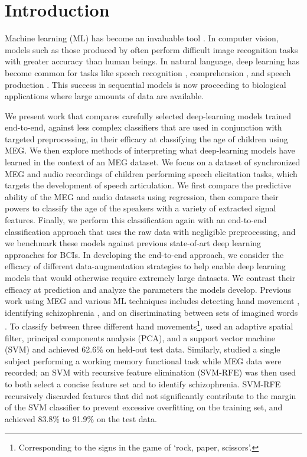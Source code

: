 \documentclass[utf8]{frontiersSCNS} %
\begin{document}
\section{Introduction}


Machine learning (ML) has become an invaluable tool \cite{LeCun2015}. In computer vision, models such as those produced by \cite{He2015a} often perform difficult image recognition tasks with greater accuracy than  human beings. In natural language, deep learning has become common for tasks like speech recognition \cite{Bahdanau}, comprehension \cite{Moritz}, and speech production \cite{VanDenOord}. This success in sequential models is now proceeding to biological applications where large amounts of data are available. %

We present work that compares carefully selected deep-learning models trained end-to-end, against less complex classifiers that are used in conjunction with targeted preprocessing, in their efficacy at classifying the age of children using MEG. We then explore methods of interpreting what  deep-learning models have learned in the context of an MEG dataset. We focus on a dataset of synchronized MEG and audio recordings of children performing speech elicitation tasks, which targets the development of speech articulation. We first compare the predictive ability of the MEG and audio datasets using regression, then compare their powers to classify the age of the speakers with a variety of extracted signal features. Finally, we perform this classification again with an end-to-end classification approach that uses the raw data with negligible preprocessing, and we benchmark these models against previous state-of-art deep learning approaches for BCIs. In developing the end-to-end approach, we consider the efficacy of different data-augmentation strategies to help enable deep learning models that would otherwise require extremely large datasets. We contrast their efficacy at prediction and analyze the parameters the models develop. Previous work using MEG and various ML techniques includes detecting hand movement \cite{Asano2009}, identifying schizophrenia \cite{Ince2008}, and on discriminating between sets of imagined words \cite{Guimaraes2007}. To classify between three different hand movements\footnote{Corresponding to the signs in the game of `rock, paper, scissors'.}, \cite{Asano2009} used an adaptive spatial filter, principal components analysis (PCA), and a support vector machine (SVM) and achieved 62.6\% on held-out test data. Similarly, \cite{Ince2008} studied a single subject performing a working memory functional task while MEG data were recorded; an SVM with recursive feature elimination (SVM-RFE) was then used to both select a concise feature set and to identify schizophrenia. SVM-RFE recursively discarded features that did not significantly contribute to the margin of the SVM classifier to prevent excessive overfitting on the training set, and achieved 83.8\% to 91.9\% on the test data.
\end{document}
